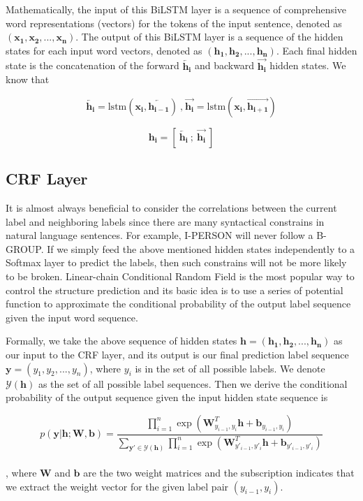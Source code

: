 Mathematically, the input of this BiLSTM layer is a sequence of comprehensive word representations (vectors) for the tokens of the input sentence,  denoted as 
$( \mathbf{x_1}, \mathbf{x_2},...,\mathbf{x_n})$. 
The output of this BiLSTM layer is a sequence of the hidden states for each input word vectors, denoted as 
$( \mathbf{h_1}, \mathbf{h_2},...,\mathbf{h_n})$. 
Each final hidden state is the concatenation of the forward $\overleftarrow{\mathbf{h_i}}$ and backward $\overrightarrow{\mathbf{h_i}}$ hidden states.
We know that 

$$\overleftarrow{\mathbf{h_i}}= \text{lstm}(\mathbf{x_i}, \overleftarrow{\mathbf{h_{i-1}}})~\text{,}~\overrightarrow{\mathbf{h_i}}= \text{lstm}(\mathbf{x_i}, \overrightarrow{\mathbf{h_{i+1}}})$$ 

$$\mathbf{h_i} = \left[~\overleftarrow{\mathbf{h_i}}~;~\overrightarrow{\mathbf{h_i}}~\right]$$


\subsection{CRF Layer}
It is almost always beneficial to consider the correlations between the current label and neighboring labels since there are many syntactical constrains in natural language sentences. 
For example, I-PERSON will never follow a B-GROUP. 
If we simply feed the above mentioned hidden states independently to a Softmax layer to predict the labels, then such constrains will not be more likely to be broken. 
Linear-chain Conditional Random Field is the most popular way to control the structure prediction and its basic idea is to use a series of potential function to approximate the conditional probability of the output label sequence given the input word sequence. 

Formally, we take the above sequence of hidden states  $ \mathbf{h} = ( \mathbf{h_1}, \mathbf{h_2},...,\mathbf{h_n})$ as our input to the CRF layer, and its output is our final prediction label sequence $\mathbf{y} = ( {y_1}, {y_2},...,{y_n})$, where $y_i$ is in the set of all possible labels. 
We denote $\mathcal{Y}(\mathbf{h})$ as the set of all possible label sequences.
Then we derive the conditional probability of the output sequence given the input hidden state sequence is 

{\small $$ p(\mathbf{y}|\mathbf{h}; \mathbf{W},\mathbf{b}) 
= \frac{\prod_{i=1}^n \exp(\mathbf{W}^T_{y_{i-1},y_{i}}\mathbf{h} + \mathbf{b}_{y_{i-1},y_{i}})}
{ \sum_{\mathbf{y'} \in \mathcal{Y}(\mathbf{h})} \prod_{i=1}^n \exp(\mathbf{W}^T_{y'_{i-1},y'_{i}}\mathbf{h} + \mathbf{b}_{y'_{i-1},y'_{i}})} 
$$}\\
\newpage
\noindent
, where $\mathbf W$ and $\mathbf b$ are the two weight matrices and the subscription indicates that we extract the weight vector for the given label pair $(y_{i-1},y_i)$. 

